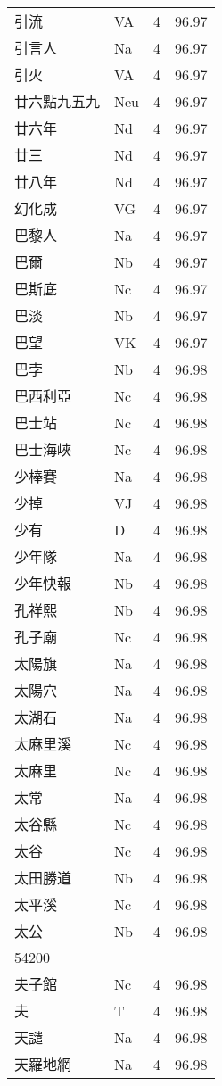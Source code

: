 \documentclass[twocolumn]{book}
\begin{document}
\begin{supertabular}{llrr}
引流 & VA & 4 &  96.97\\
引言人 & Na & 4 &  96.97\\
引火 & VA & 4 &  96.97\\
廿六點九五九 & Neu & 4 &  96.97\\
廿六年 & Nd & 4 &  96.97\\
廿三 & Nd & 4 &  96.97\\
廿八年 & Nd & 4 &  96.97\\
幻化成 & VG & 4 &  96.97\\
巴黎人 & Na & 4 &  96.97\\
巴爾 & Nb & 4 &  96.97\\
巴斯底 & Nc & 4 &  96.97\\
巴淡 & Nb & 4 &  96.97\\
巴望 & VK & 4 &  96.97\\
巴孛 & Nb & 4 &  96.98\\
巴西利亞 & Nc & 4 &  96.98\\
巴士站 & Nc & 4 &  96.98\\
巴士海峽 & Nc & 4 &  96.98\\
少棒賽 & Na & 4 &  96.98\\
少掉 & VJ & 4 &  96.98\\
少有 & D & 4 &  96.98\\
少年隊 & Na & 4 &  96.98\\
少年快報 & Nb & 4 &  96.98\\
孔祥熙 & Nb & 4 &  96.98\\
孔子廟 & Nc & 4 &  96.98\\
太陽旗 & Na & 4 &  96.98\\
太陽穴 & Na & 4 &  96.98\\
太湖石 & Na & 4 &  96.98\\
太麻里溪 & Nc & 4 &  96.98\\
太麻里 & Nc & 4 &  96.98\\
太常 & Na & 4 &  96.98\\
太谷縣 & Nc & 4 &  96.98\\
太谷 & Nc & 4 &  96.98\\
太田勝道 & Nb & 4 &  96.98\\
太平溪 & Nc & 4 &  96.98\\
太公 & Nb & 4 &  96.98\\
54200\\
夫子館 & Nc & 4 &  96.98\\
夫 & T & 4 &  96.98\\
天譴 & Na & 4 &  96.98\\
天羅地網 & Na & 4 &  96.98\\

\end{supertabular}
\end{document}
